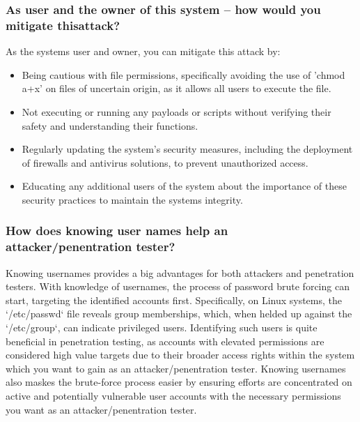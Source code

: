 \subsubsection{As user and the owner of this system -- how would you mitigate thisattack?}
As the systems user and owner, you can mitigate this attack by:

\begin{itemize}
    \item Being cautious with file permissions, specifically avoiding the use of 'chmod a+x' on files of uncertain origin, as it allows all users to execute the file.
    \item Not executing or running any payloads or scripts without verifying their safety and understanding their functions.
    \item Regularly updating the system's security measures, including the deployment of firewalls and antivirus solutions, to prevent unauthorized access.
    \item Educating any additional users of the system about the importance of these security practices to maintain the systems integrity.
\end{itemize}




\subsubsection{How does knowing user names help an attacker/penentration tester?}
Knowing usernames provides a big advantages for both attackers and penetration testers.
With knowledge of usernames, the process of password brute forcing can start, targeting the identified accounts first.
Specifically, on Linux systems, the `/etc/passwd` file reveals group memberships, which, when helded up against the `/etc/group`, can indicate privileged users.
Identifying such users is quite beneficial in penetration testing, as accounts with elevated permissions are considered
high value targets due to their broader access rights within the system which you want to gain as an attacker/penentration tester.
Knowing usernames also maskes the brute-force process easier by ensuring efforts are
concentrated on active and potentially vulnerable user accounts with the necessary permissions you want as an attacker/penentration tester.


